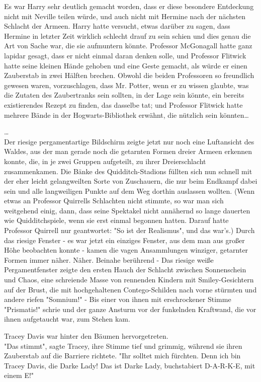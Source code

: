{Es war Harry sehr deutlich gemacht worden, dass er diese besondere Entdeckung nicht mit Neville teilen würde, und auch nicht mit Hermine nach der nächsten Schlacht der Armeen. Harry hatte versucht, etwas darüber zu sagen, dass Hermine in letzter Zeit wirklich schlecht drauf zu sein schien und dies genau die Art von Sache war, die sie aufmuntern könnte. Professor McGonagall hatte ganz lapidar gesagt, dass er nicht einmal daran denken solle, und Professor Flitwick hatte seine kleinen Hände gehoben und eine Geste gemacht, als würde er einen Zauberstab in zwei Hälften brechen. Obwohl die beiden Professoren so freundlich gewesen waren, vorzuschlagen, dass Mr. Potter, wenn er zu wissen glaubte, was die Zutaten des Zaubertranks sein sollten, in der Lage sein könnte, ein bereits existierendes Rezept zu finden, das dasselbe tat; und Professor Flitwick hatte mehrere Bände in der Hogwarts-Bibliothek erwähnt, die nützlich sein könnten…

…\\ Der riesige pergamentartige Bildschirm zeigte jetzt nur noch eine Luftansicht des Waldes, aus der man gerade noch die getarnten Formen dreier Armeen erkennen konnte, die, in je zwei Gruppen aufgeteilt, zu ihrer Dreierschlacht zusammenkamen. Die Bänke des Quidditch-Stadions füllten sich nun schnell mit der eher leicht gelangweilten Sorte von Zuschauern, die nur beim Endkampf dabei sein und alle langweiligen Punkte auf dem Weg dorthin auslassen wollten. (Wenn etwas an Professor Quirrells Schlachten nicht stimmte, so war man sich weitgehend einig, dann, dass seine Spektakel nicht annähernd so lange dauerten wie Quidditchspiele, wenn sie erst einmal begonnen hatten. Darauf hatte Professor Quirrell nur geantwortet: "So ist der Realismus", und das war's.) Durch das riesige Fenster - es war jetzt ein einziges Fenster, aus dem man aus großer Höhe beobachten konnte - kamen die vagen Ansammlungen winziger, getarnter Formen immer näher. Näher. Beinahe berührend - Das riesige weiße Pergamentfenster zeigte den ersten Hauch der Schlacht zwischen Sonnenschein und Chaos, eine schreiende Masse von rennenden Kindern mit Smiley-Gesichtern auf der Brust, die mit hochgehaltenen Contego-Schilden nach vorne stürmten und andere riefen "Somnium!" - Bis einer von ihnen mit erschrockener Stimme "Prismatis!" schrie und der ganze Ansturm vor der funkelnden Kraftwand, die vor ihnen aufgetaucht war, zum Stehen kam.

Tracey Davis war hinter den Bäumen hervorgetreten.\\ "Das stimmt", sagte Tracey, ihre Stimme tief und grimmig, während sie ihren Zauberstab auf die Barriere richtete. "Ihr solltet mich fürchten. Denn ich bin Tracey Davis, die Darke Lady! Das ist Darke Lady, buchstabiert D-A-R-K-E, mit einem E!"

}
